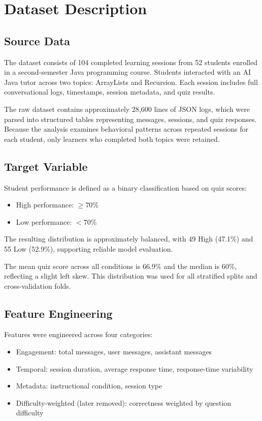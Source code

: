 \documentclass[conference]{IEEEtran}
\begin{document}
\section{Dataset Description}

\subsection{Source Data}
The dataset consists of 104 completed learning sessions from 52 students enrolled in a second-semester Java programming course. Students interacted with an AI Java tutor across two topics: ArrayLists and Recursion. Each session includes full conversational logs, timestamps, session metadata, and quiz results.

The raw dataset contains approximately 28,600 lines of JSON logs, which were parsed into structured tables representing messages, sessions, and quiz responses. Because the analysis examines behavioral patterns across repeated sessions for each student, only learners who completed both topics were retained.

\subsection{Target Variable}
Student performance is defined as a binary classification based on quiz scores:
\begin{itemize}[noitemsep]
    \item High performance: $\geq 70\%$
    \item Low performance: $< 70\%$
\end{itemize}


The resulting distribution is approximately balanced, with  49 High (47.1\%) and 55 Low (52.9\%), supporting reliable model evaluation.

The mean quiz score across all conditions is 66.9\% and the median is 60\%, reflecting a slight left skew. This distribution was used for all stratified splits and cross-validation folds.

\subsection{Feature Engineering}
Features were engineered across four categories:
\begin{itemize}
    \item Engagement: total messages, user messages, assistant messages
    \item Temporal: session duration, average response time, response-time variability
    \item Metadata: instructional condition, session type
    \item Difficulty-weighted (later removed): correctness weighted by question difficulty
\end{itemize}
\end{document}
